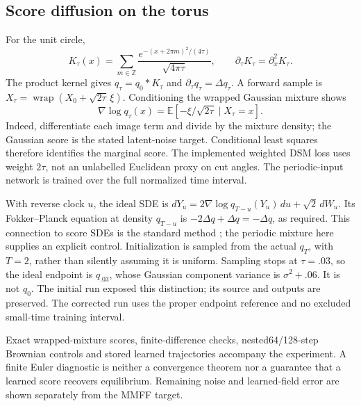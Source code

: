 \documentclass[11pt]{article}
\theoremstyle{definition}\newtheorem{definition}[theorem]{Definition}
\theoremstyle{remark}\newtheorem{remark}[theorem]{Remark}
\begin{document}
\subsection{Score diffusion on the torus}
For the unit circle,
\[
 K_\tau(x)=\sum_{m\in\mathbb Z}\frac{e^{-(x+2\pi m)^2/(4\tau)}}{\sqrt{4\pi\tau}},
 \qquad \partial_\tau K_\tau=\partial_x^2K_\tau.
\]
The product kernel gives $q_\tau=q_0*K_\tau$ and
$\partial_\tau q_\tau=\Delta q_\tau$. A forward sample is
$X_\tau=\operatorname{wrap}(X_0+\sqrt{2\tau}\,\xi)$.
Conditioning the wrapped Gaussian mixture shows
\[
 \nabla\log q_\tau(x)
 =\mathbb E[-\xi/\sqrt{2\tau}\mid X_\tau=x].
\]
Indeed, differentiate each image term and divide by the mixture density;
the Gaussian score is the stated latent-noise target. Conditional least
squares therefore identifies the marginal score. The implemented weighted
DSM loss uses weight $2\tau$, not an unlabelled Euclidean proxy on cut angles.
The periodic-input network is trained over the full normalized time interval.

With reverse clock $u$, the ideal SDE is
$dY_u=2\nabla\log q_{T-u}(Y_u)\,du+\sqrt2\,dW_u$.
Its Fokker--Planck equation at density $q_{T-u}$ is
$-2\Delta q+\Delta q=-\Delta q$, as required. This connection to score SDEs
is the standard method \cite{VisScore}; the periodic mixture here supplies an
explicit control. Initialization is sampled from the actual $q_T$, with $T=2$,
rather than silently assuming it is uniform. Sampling stops at $\tau=.03$,
so the ideal endpoint is $q_{.03}$, whose Gaussian component variance is
$\sigma^2+.06$. It is not $q_0$. The initial run exposed this distinction;
its source and outputs are preserved. The corrected run uses the proper endpoint
reference and no excluded small-time training interval.

Exact wrapped-mixture scores, finite-difference checks, nested64/128-step
Brownian controls and stored learned trajectories accompany the experiment.
A finite Euler diagnostic is neither a convergence theorem nor a guarantee
that a learned score recovers equilibrium. Remaining noise and learned-field
error are shown separately from the MMFF target.
\end{document}
